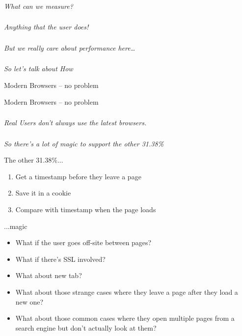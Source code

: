 \documentclass{beamer}
\newcommand{\innersplash}[1]{
  \begin{center}
    \Large \textrm{\textit{ #1 } }
  \end{center}
}
\newcommand{\splashslide}[2][{}]{
  \begin{frame}
  \frametitle{#1}
  \innersplash{#2}
  \end{frame}
}
\begin{document}
\splashslide{What can we measure?}

\splashslide{Anything that the user does! \\ \only<2->{(in the browser)}}

\splashslide{But we really care about performance here\ldots}

\splashslide{So let's talk about How}

\begin{frame}{Modern Browsers -- no problem}
\end{frame}

\begin{frame}{Modern Browsers -- no problem}
\end{frame}

\splashslide{Real Users don't always use the latest browsers.}

\splashslide{So there's a lot of magic to support the other 31.38\%}

\begin{frame}{The other 31.38\%...}
  \begin{enumerate}
  \item Get a timestamp before they leave a page
  \item Save it in a cookie
  \item Compare with timestamp when the page loads
  \end{enumerate}
\end{frame}

\begin{frame}{...magic}
  \begin{itemize}
    \item What if the user goes off-site between pages?
    \item What if there's SSL involved?
    \item What about new tab?
    \item What about those strange cases where they leave a page after they load a new one?
    \item What about those common cases where they open multiple pages from a search engine but don't actually look at them?
  \end{itemize}
\end{frame}
\end{document}
